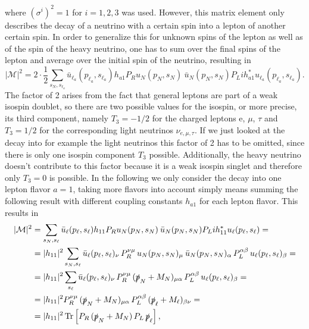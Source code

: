 where $\left(\sigma^i\right)^2=1$ for $i=1,2,3$ was used. \newline\indent
However, this matrix element only describes the decay of a neutrino with a certain spin into a lepton of another certain spin. In order to generalize this for unknown spins of the lepton as well as of the spin of the heavy neutrino, one has to sum over the final spins of the lepton and average over the initial spin of the neutrino, resulting in
\begin{equation*}
|\mathcal{M}|^2=2\cdot\frac{1}{2}\sum_{s_N,s_{\ell_a}}\bar{u}_{\ell_a}(p_{\ell_a},s_{\ell_a})h_{a1}P_Ru_N(p_N,s_N)\:\bar{u}_{N}(p_{N},s_{N})P_Lih^*_{a1}u_{\ell_a}(p_{\ell_a},s_{\ell_a}).
\end{equation*}
The factor of 2 arises from the fact that general leptons are part of a weak isospin doublet, so there are two possible values for the isospin, or more precise, its third component, namely $T_3=-1/2$ for the charged leptons e, $\mu$, $\tau$ and $T_3=1/2$ for the corresponding light neutrinos $\nu_{e,\mu,\tau}$. If we just looked at the decay into for example the light neutrinos this factor of 2 has to be omitted, since there is only one isospin component $T_3$ possible. Additionally, the heavy neutrino doesn't contribute to this factor because it is a weak isospin singlet and therefore only $T_3=0$ is possible. \newline\indent
In the following we only consider the decay into one lepton flavor $a=1$, taking more flavors into account simply means summing the following result with different coupling constants $h_{a1}$ for each lepton flavor. This results in
\begin{align*}
|\mathcal{M}|^2&=\sum_{s_N,s_{\ell}}\bar{u}_{\ell}(p_{\ell},s_{\ell})h_{11}P_Ru_N(p_N,s_N)\:\bar{u}_{N}(p_{N},s_{N})P_Lih^*_{11}u_{\ell}(p_{\ell},s_{\ell})=\\
&=|h_{11}|^2\sum_{s_N,s_{\ell}}\bar{u}_{\ell}(p_{\ell},s_{\ell})_\nu\, P_R^{\nu\mu}\,u_N(p_N,s_N)_\mu\:\bar{u}_{N}(p_{N},s_{N})_\alpha\, P_L^{\alpha\beta}\,u_{\ell}(p_{\ell},s_{\ell})_\beta=\\
&=|h_{11}|^2\sum_{s_{\ell}}\bar{u}_{\ell}(p_{\ell},s_{\ell})_\nu\, P_R^{\nu\mu}\,(\slashed p_N+M_N)_{\mu\alpha}\, P_L^{\alpha\beta}\,u_{\ell}(p_{\ell},s_{\ell})_\beta=\\
&=|h_{11}|^2P_R^{\nu\mu}\,(\slashed p_N+M_N)_{\mu\alpha}\, P_L^{\alpha\beta}\,(\slashed p_\ell+M_\ell)_{\beta\nu}=\\
&=|h_{11}|^2\,\text{Tr}\left[P_R\,(\slashed p_N+M_N)\, P_L\,\slashed p_\ell\right],
\end{align*}
